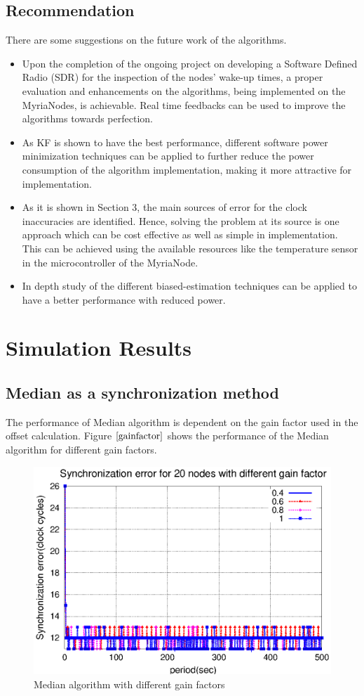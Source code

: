 \documentclass[a4paper,10pt]{report}
\begin{document}
\section{Recommendation}
There are some suggestions on the future work of the algorithms.
\begin{itemize}
 \item
Upon the completion of the ongoing project on developing a Software
Defined Radio (SDR) for the inspection of the nodes' wake-up times,
a proper evaluation and enhancements on the algorithms, being
implemented on the MyriaNodes, is achievable. Real time feedbacks
can be used to improve the algorithms towards perfection.
\item
As KF is shown to have the best performance, different software
power minimization techniques can be applied to further reduce the
power consumption of the algorithm implementation, making it more
attractive for implementation.
\item As it is shown in Section 3, the main
sources of error for the clock inaccuracies are identified. Hence,
solving the problem at its source is one approach which can be cost
effective as well as simple in implementation. This can be achieved
using the available resources like the temperature sensor in the
microcontroller of the MyriaNode.
\item In depth study of the different biased-estimation techniques can be applied to have a better performance with reduced power.
\end{itemize}
\appendix
\chapter{Simulation Results}
\section{Median as a synchronization method}
The performance of Median algorithm is dependent on the gain factor
used in the offset calculation. Figure $\ref{gainfactor}$ shows the
performance of the Median algorithm for different gain factors.
\begin{figure}[!h]
\centering
\includegraphics[width= 0.7 \textwidth]{gainfactor}
\caption{Median algorithm with different gain factors} \label{gainfactor}
\end{figure}
\end{document}
